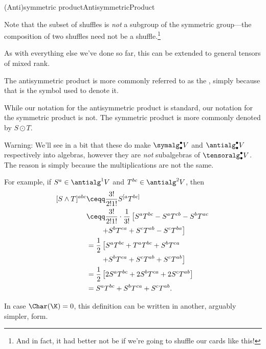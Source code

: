 \begin{dfn}{(Anti)symmetric product}{AntisymmetricProduct}
\begin{rmk}
		Note that the subset of shuffles is \emph{not} a subgroup of the symmetric group---the composition of two shuffles need not be a shuffle.\footnote{And in fact, it had better not be if we're going to shuffle our cards like this!}
	\end{rmk}
	\begin{rmk}
		As with everything else we've done so far, this can be extended to general tensors of mixed rank.
	\end{rmk}
	\begin{rmk}
		The antisymmetric product is more commonly referred to as the , simply because that is the symbol used to denote it.
	\end{rmk}
	\begin{rmk}
		While our notation for the antisymmetric product is standard, our notation for the symmetric product is not.  The symmetric product is more commonly denoted by $S\odot T$\index[notation]{$S\odot T$}.
	\end{rmk}
	\begin{rmk}
		Warning:  We'll see in a bit that these do make $\symalg _{\bullet}^{\bullet}V$ and $\antialg _{\bullet}^{\bullet}V$ respectively into algebras, however they are \emph{not} subalgebras of $\tensoralg _{\bullet}^{\bullet}V$.  The reason is simply because the multiplications are not the same.
	\end{rmk}
\end{dfn}
\begin{exm}{}{}
	For example, if $S^a\in \antialg ^1V$ and $T^{bc}\in \antialg ^2V$, then
	\begin{equation}
		\begin{split}
			[S\wedge T]^{abc} & \ceqq \frac{3!}{2!1!}S^{[a}T^{bc]} \\
			& \ceqq \frac{3!}{2!1!}\cdot \frac{1}{3!}\left[ S^aT^{bc}-S^aT^{cb}-S^bT^{ac}\right. \\ & \qquad \left. +S^bT^{ca}+S^cT^{ab}-S^cT^{ba}\right] \\
			& =\frac{1}{2}\left[ S^aT^{bc}+T^aT^{bc}+S^bT^{ca}\right. \\ & \qquad \left. +S^bT^{ca}+S^cT^{ab}+S^cT^{ab}\right] \\
			& =\frac{1}{2}\left[ 2S^aT^{bc}+2S^bT^{ca}+2S^cT^{ab}\right] \\
			& =S^aT^{bc}+S^bT^{ca}+S^cT^{ab}.
		\end{split}
	\end{equation}
\end{exm}
In case $\Char (\K )=0$, this definition can be written in another, arguably simpler, form.
